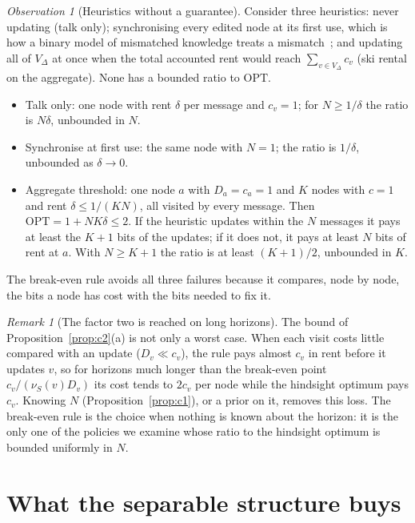 \documentclass[11pt]{article}
\theoremstyle{definition}
\theoremstyle{remark}
\newtheorem{remark}{Remark}
\newtheorem{observation}{Observation}
\newcommand{\OPT}{\mathrm{OPT}}
\begin{document}
\begin{observation}[Heuristics without a guarantee]\label{obs:heur}
Consider three heuristics: never updating (talk only); synchronising every edited node at its first use, which is how a binary model of mismatched knowledge treats a mismatch~\cite{chen2025mismatch}; and updating all of $V_\Delta$ at once when the total accounted rent would reach $\sum_{v\in V_\Delta}c_v$ (ski rental on the aggregate). None has a bounded ratio to $\OPT$.
\begin{itemize}
\item Talk only: one node with rent $\delta$ per message and $c_v=1$; for $N\ge1/\delta$ the ratio is $N\delta$, unbounded in $N$.
\item Synchronise at first use: the same node with $N=1$; the ratio is $1/\delta$, unbounded as $\delta\to0$.
\item Aggregate threshold: one node $a$ with $D_a=c_a=1$ and $K$ nodes with $c=1$ and rent $\delta\le1/(KN)$, all visited by every message. Then $\OPT=1+NK\delta\le2$. If the heuristic updates within the $N$ messages it pays at least the $K+1$ bits of the updates; if it does not, it pays at least $N$ bits of rent at $a$. With $N\ge K+1$ the ratio is at least $(K+1)/2$, unbounded in $K$.
\end{itemize}
The break-even rule avoids all three failures because it compares, node by node, the bits a node has cost with the bits needed to fix it.
\end{observation}

\begin{remark}[The factor two is reached on long horizons]\label{rem:long}
The bound of Proposition~\ref{prop:c2}(a) is not only a worst case. When each visit costs little compared with an update ($D_v\ll c_v$), the rule pays almost $c_v$ in rent before it updates $v$, so for horizons much longer than the break-even point $c_v/(\nu_S(v)D_v)$ its cost tends to $2c_v$ per node while the hindsight optimum pays $c_v$. Knowing $N$ (Proposition~\ref{prop:c1}), or a prior on it, removes this loss. The break-even rule is the choice when nothing is known about the horizon: it is the only one of the policies we examine whose ratio to the hindsight optimum is bounded uniformly in $N$.
\end{remark}

\section{What the separable structure buys}
\end{document}
